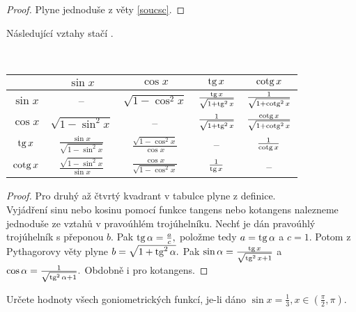 \begin{proof}
    Plyne jednoduše z věty \ref{soucsc}.
\end{proof}

\begin{pozn}
    Následující vztahy stačí .
\end{pozn}

\begin{veta}\label{vyjadrenigonf}
  \,\\
  \begin{tabular}{| c || c | c | c | c |}
    \hline
    & $\sin x$ & $\cos x$ & $\operatorname{tg} x$ & $\operatorname{cotg} x$ \\
    \hline\hline
    $\sin x$ & -- & $\sqrt{1-\cos^2 x}$ & $\frac{\operatorname{tg} x}{\sqrt{1+\operatorname{tg}^2 x}}$ & $\frac{1}{\sqrt{1+\operatorname{cotg}^2 x}}$\\
    \hline
    $\cos x$ & $\sqrt{1-\sin^2 x}$ & -- & $\frac{1}{\sqrt{1+\operatorname{tg}^2 x}}$ & $\frac{\operatorname{cotg} x}{\sqrt{1+\operatorname{cotg}^2 x}}$\\
    \hline
    $\operatorname{tg} x$ & $\frac{\sin x}{\sqrt{1-\sin^2 x}}$ &  $\frac{\sqrt{1-\cos^2 x}}{\cos x}$ & -- & $\frac{1}{\operatorname{cotg} x}$\\
    \hline
    $\operatorname{cotg} x$ & $\frac{\sqrt{1-\sin^2 x}}{\sin x}$ & $\frac{\cos x}{\sqrt{1-\cos^2 x}}$ & $\frac{1}{\operatorname{tg} x}$ & --\\
    \hline
  \end{tabular}

\end{veta}



\begin{proof}
    Pro druhý až čtvrtý kvadrant v tabulce plyne z definice. \\
    Vyjádření sinu nebo kosinu pomocí funkce tangens nebo kotangens nalezneme
    jednoduše ze vztahů v pravoúhlém trojúhelníku. Nechť je dán pravoúhlý trojúhelník
    s přeponou $b.$ Pak $\operatorname{tg} \alpha = \frac{a}{c},$ položme tedy $a = \operatorname{tg} \alpha$ a $c=1. $
    Potom z Pythagorovy věty plyne $b=\sqrt{1+\operatorname{tg}^2 \alpha}. $ Pak $\sin\alpha = \frac{\operatorname{tg} x}{\sqrt{\operatorname{tg}^2 x+1} }$ a
    $\cos \alpha = \frac{1}{\sqrt{\operatorname{tg}^2 \alpha + 1} }.$ Obdobně i pro kotangens.
\end{proof}

\begin{priklad}
Určete hodnoty všech goniometrických funkcí, je-li dáno $\sin x=\frac{1}{3}, x \in \left ( \frac{\pi}{2},\pi \right ). $
\end{priklad}

